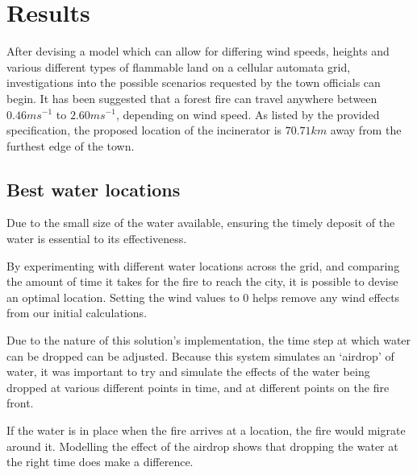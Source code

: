 \documentclass[11pt, a4paper, titlepage]{article}
\begin{document}
\section{Results}
After devising a model which can allow for differing wind speeds, heights and various different types of flammable land on a cellular automata grid, investigations into the possible scenarios requested by the town officials can begin. It has been suggested that a forest fire can travel anywhere between $0.46ms^{-1}$ \cite{viegas2009recent} to $2.60ms^{-1}$, depending on wind speed. As listed by the provided specification, the proposed location of the incinerator is $70.71km$ away from the furthest edge of the town. 






  \subsection{Best water locations}
  Due to the small size of the water available, ensuring the timely deposit of the water is essential to its effectiveness.

  By experimenting with different water locations across the grid, and comparing the amount of time it takes for the fire to reach the city, it is possible to devise an optimal location. Setting the wind values to 0 helps remove any wind effects from our initial calculations.

  Due to the nature of this solution's implementation, the time step at which water can be dropped can be adjusted. Because this system simulates an `airdrop' of water, it was important to try and simulate the effects of the water being dropped at various different points in time, and at different points on the fire front.

  If the water is in place when the fire arrives at a location, the fire would migrate around it. Modelling the effect of the airdrop shows that dropping the water at the right time does make a difference.
\end{document}
